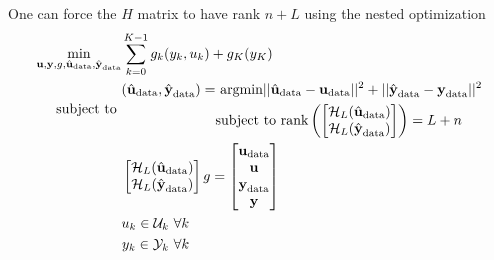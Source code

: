 One can force the $H$ matrix to have rank $n+L$ using the nested optimization
\begin{align}
  \label{eq:deepc-cost-function}
  \min_{\boldsymbol{\mathrm{u}},\boldsymbol{\mathrm{y}},g,\hat{\boldsymbol{\mathrm{u}}}_\textrm{data},\hat{\boldsymbol{\mathrm{y}}}_\textrm{data}} & \sum_{k=0}^{K-1} g_k(y_k,u_k) + g_K(y_K) \\
  \textrm{subject to } &
                         \begin{aligned}
                           (\hat{\boldsymbol{\mathrm{u}}}_\textrm{data},\hat{\boldsymbol{\mathrm{y}}}_\textrm{data}) = &\ \textrm{argmin} ||\hat{\boldsymbol{\mathrm{u}}}_\textrm{data} - \boldsymbol{\mathrm{u}}_\textrm{data}||^2 + ||\hat{\boldsymbol{\mathrm{y}}}_\textrm{data} - \boldsymbol{\mathrm{y}}_\textrm{data}||^2 \\
                                                                                 & \textrm{subject to } \textrm{rank} \left(
                                                                                   \begin{bmatrix}
                                                                                     \mathcal{H}_L(\hat{\boldsymbol{\mathrm{u}}}_\textrm{data}) \\
                                                                                     \mathcal{H}_L(\hat{\boldsymbol{\mathrm{y}}}_\textrm{data})
                                                                                   \end{bmatrix}
                                                                                   \right) = L+n
                                                                                   \label{eq:deepc-nested-optimization}
                         \end{aligned} \\
                                                                       & \begin{bmatrix}
                                                                           \mathcal{H}_L(\hat{\boldsymbol{\mathrm{u}}}_\textrm{data}) \\
                                                                           \mathcal{H}_L(\hat{\boldsymbol{\mathrm{y}}}_\textrm{data})
                                                                         \end{bmatrix}g =
                                                                         \begin{bmatrix}
                                                                           \boldsymbol{\mathrm{u}}_\textrm{data} \\ \boldsymbol{\mathrm{u}} \\ \boldsymbol{\mathrm{y}}_\textrm{data} \\ \boldsymbol{\mathrm{y}}
                                                                         \end{bmatrix} \\
                                                                       & \begin{aligned}
                                                                           u_k \in \mathcal{U}_k\ \forall k \\
                                                                           y_k \in \mathcal{Y}_k\ \forall k
                                                                         \end{aligned}
\end{align}

